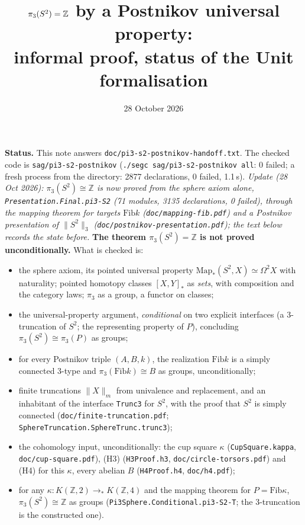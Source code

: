 \documentclass[11pt]{amsart}
\title{$\pi_3(S^2)=\Z$ by a Postnikov universal property:\\ informal proof, status of the Unit formalisation}
\date{28 October 2026}
\theoremstyle{definition}
\theoremstyle{remark}
\newcommand{\Om}{\Omega}
\newcommand{\Map}{\mathrm{Map}_*}
\newcommand{\Fib}{\mathrm{Fib}}
\newcommand{\Z}{\mathbb{Z}}
\newcommand{\tr}[2]{\|#1\|_{#2}}
\newcommand{\hc}[2]{[#1,#2]_*}
\newcommand{\code}[1]{\texttt{#1}}
\begin{document}
\maketitle

\noindent\textbf{Status.}
This note answers \code{doc/pi3-s2-postnikov-handoff.txt}. The checked
code is \code{sag/pi3-s2-postnikov} (\code{./segc sag/pi3-s2-postnikov
all}: 0 failed; a fresh process from the directory: 2877
declarations, 0 failed, 1.1\,s). \emph{Update (28 Oct 2026): $\pi_3(S^2)\cong\Z$
is now proved from the sphere axiom alone,
\code{Presentation.Final.pi3-S2} (71 modules, 3135 declarations, 0
failed), through the mapping theorem for targets $\Fib k$
(\code{doc/mapping-fib.pdf}) and a Postnikov presentation of
$\tr{S^2}3$ (\code{doc/postnikov-presentation.pdf}); the text below
records the state before.} \textbf{The theorem $\pi_3(S^2)=\Z$ is
not proved unconditionally.} What is checked is:
\begin{itemize}
\item[(A)] the sphere axiom, its pointed universal property
  $\Map(S^2,X)\simeq\Om^2X$ with naturality; pointed homotopy classes
  $\hc XY$ as \emph{sets}, with composition and the category laws;
  $\pi_3$ as a group, a functor on classes;
\item[(B)] the universal-property argument, \emph{conditional} on two
  explicit interfaces (a 3-truncation of $S^2$; the representing property
  of $P$), concluding $\pi_3(S^2)\cong\pi_3(P)$ as groups;
\item[(C, objects)] for every Postnikov triple $(A,B,k)$, the realization
  $\Fib k$ is a simply connected 3-type and $\pi_3(\Fib k)\cong B$ as
  groups, unconditionally;
\item[(A$'$)] finite truncations $\tr X{m}$ from univalence and
  replacement, and an inhabitant of the interface \code{Trunc3} for
  $S^2$, with the proof that $S^2$ is simply connected
  (\code{doc/finite-truncation.pdf}; \code{SphereTruncation.SphereTrunc.trunc3});
\item[(H)] the cohomology input, unconditionally: the cup square
  $\kappa$ (\code{CupSquare.kappa}, \code{doc/cup-square.pdf}),
  (H3) (\code{H3Proof.h3}, \code{doc/circle-torsors.pdf}) and (H4) for
  this $\kappa$, every abelian $B$ (\code{H4Proof.h4},
  \code{doc/h4.pdf});
\item[(E, conditional)] for any $\kappa:K(\Z,2)\to_*K(\Z,4)$ and the
  mapping theorem for $P=\Fib\kappa$, $\pi_3(S^2)\cong\Z$ as groups
  (\code{Pi3Sphere.Conditional.pi3-S2-T}; the 3-truncation is the
  constructed one).
\end{itemize}
\end{document}

